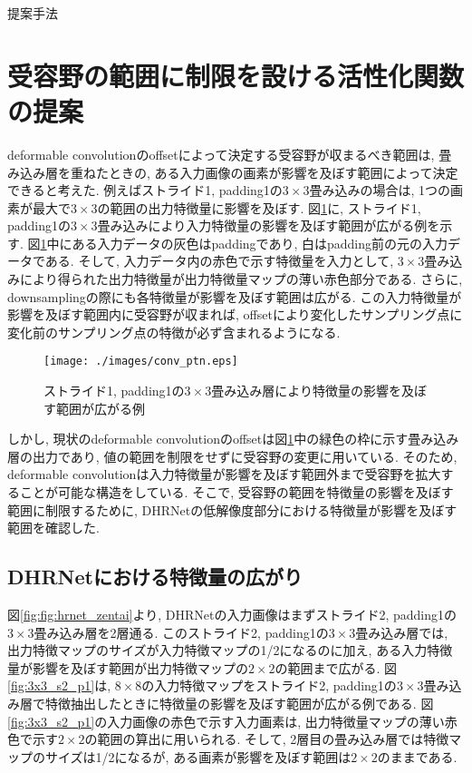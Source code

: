 \begin{chapter}{提案手法}
\section{受容野の範囲に制限を設ける活性化関数の提案}\label{sec:teian}
deformable convolutionのoffsetによって決定する受容野が収まるべき範囲は, 畳み込み層を重ねたときの, ある入力画像の画素が影響を及ぼす範囲によって決定できると考えた. 例えばストライド1, padding1の$3\times3$畳み込みの場合は, 1つの画素が最大で$3\times3$の範囲の出力特徴量に影響を及ぼす. 図\ref{fig:conv_ptn}に, ストライド1, padding1の$3\times3$畳み込みにより入力特徴量の影響を及ぼす範囲が広がる例を示す. 図\ref{fig:conv_ptn}中にある入力データの灰色はpaddingであり, 白はpadding前の元の入力データである. そして, 入力データ内の赤色で示す特徴量を入力として, $3\times3$畳み込みにより得られた出力特徴量が出力特徴量マップの薄い赤色部分である. さらに, downsamplingの際にも各特徴量が影響を及ぼす範囲は広がる. この入力特徴量が影響を及ぼす範囲内に受容野が収まれば, offsetにより変化したサンプリング点に変化前のサンプリング点の特徴が必ず含まれるようになる. \\
\begin{figure}[H]
  \centering
  \texttt{[image: ./images/conv\_ptn.eps]}
  \caption{ストライド1, padding1の$3\times3$畳み込み層により特徴量の影響を及ぼす範囲が広がる例}
  \label{fig:conv_ptn}
\end{figure}
しかし, 現状のdeformable convolutionのoffsetは図\ref{fig:conv_ptn}中の緑色の枠に示す畳み込み層の出力であり, 値の範囲を制限をせずに受容野の変更に用いている. そのため, deformable convolutionは入力特徴量が影響を及ぼす範囲外まで受容野を拡大することが可能な構造をしている. そこで, 受容野の範囲を特徴量の影響を及ぼす範囲に制限するために, DHRNetの低解像度部分における特徴量が影響を及ぼす範囲を確認した. 

\subsection{DHRNetにおける特徴量の広がり}\label{subsec:dhrnet_feature_map}
図\ref{fig:fig:hrnet_zentai}より, DHRNetの入力画像はまずストライド2, padding1の$3\times3$畳み込み層を2層通る. このストライド2, padding1の$3\times3$畳み込み層では, 出力特徴マップのサイズが入力特徴マップの1/2になるのに加え, ある入力特徴量が影響を及ぼす範囲が出力特徴マップの$2\times2$の範囲まで広がる. 図\ref{fig:3x3_s2_p1}は, $8\times8$の入力特徴マップをストライド2, padding1の$3\times3$畳み込み層で特徴抽出したときに特徴量の影響を及ぼす範囲が広がる例である. 図\ref{fig:3x3_s2_p1}の入力画像の赤色で示す入力画素は, 出力特徴量マップの薄い赤色で示す$2\times2$の範囲の算出に用いられる. そして, 2層目の畳み込み層では特徴マップのサイズは1/2になるが, ある画素が影響を及ぼす範囲は$2\times2$のままである. 


\end{chapter}
